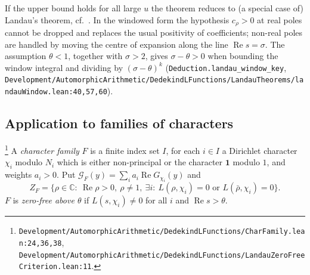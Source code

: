 \begin{remark}\label{rem:E-landau-compare}
If the upper bound holds for all large $u$ the theorem reduces to (a special case of) Landau's
theorem, cf.\ \cite[\S15.1]{E-MV}. In the windowed form the hypothesis $c_\rho>0$ at real poles
cannot be dropped and replaces the usual positivity of coefficients; non-real poles are handled by
moving the centre of expansion along the line $\operatorname{Re}s=\sigma$. The assumption
$\theta<1$, together with $\sigma>2$, gives $\sigma-\theta>0$ when bounding the window integral
and dividing by $(\sigma-\theta)^k$ (\texttt{Deduction.landau\_window\_key},
\nolinkurl{Development/AutomorphicArithmetic/DedekindLFunctions/LandauTheorems/landauWindow.lean:40,57,60}).
\end{remark}

\subsection{Application to families of characters}

\begin{definition}\label{def:E-charfamily}
\footnote{\nolinkurl{Development/AutomorphicArithmetic/DedekindLFunctions/CharFamily.lean:24,36,38}, \nolinkurl{Development/AutomorphicArithmetic/DedekindLFunctions/LandauZeroFreeCriterion.lean:11}.}%
A \emph{character family} $F$ is a finite index set $I$, for each $i\in I$ a Dirichlet character
$\chi_i$ modulo $N_i$ which is either non-principal or the character $\mathbf 1$ modulo $1$, and
weights $a_i>0$. Put $\mathcal G_F(y)=\sum_{i}a_i\operatorname{Re}G_{\chi_i}(y)$ and
\[
Z_F=\{\rho\in\mathbb C:\ \operatorname{Re}\rho>0,\ \rho\neq1,\ \exists i:\ L(\rho,\chi_i)=0\text{ or }
L(\bar\rho,\chi_i)=0\}.
\]
$F$ is \emph{zero-free above $\theta$} if $L(s,\chi_i)\neq0$ for all $i$ and
$\operatorname{Re}s>\theta$.
\end{definition}


